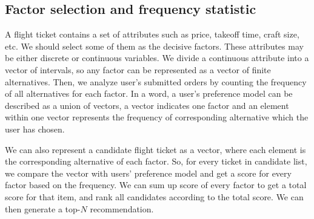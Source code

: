 \documentclass{llncs}
\begin{document}
\subsection{Factor selection and frequency statistic}
A flight ticket contains a set of attributes such as price, takeoff time, craft size, etc. We should select some of them as the decisive factors. These attributes may be either discrete or continuous variables. We divide a continuous attribute into a vector of intervals, so any factor can be represented as a vector of finite alternatives. Then, we analyze user's submitted orders by counting the frequency of all alternatives for each factor. In a word, a user's preference model can be described as a union of vectors, a vector indicates one factor and an element within one vector represents the frequency of corresponding alternative which the user has chosen.\par
We can also represent a candidate flight ticket as a vector, where each element is the corresponding alternative of each factor. So, for every ticket in candidate list, we compare the vector with users' preference model and get a score for every factor based on the frequency. We can sum up score of every factor to get a total score for that item, and rank all candidates according to the total score. We can then generate a top-$N$ recommendation.\par
\end{document}
